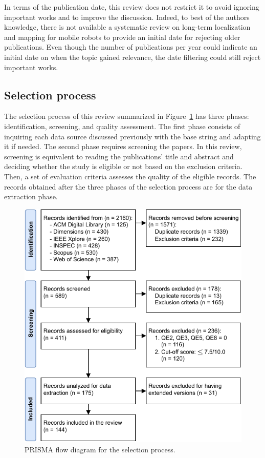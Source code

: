 In terms of the publication date, this review does not restrict it to avoid ignoring important works and to improve the discussion. Indeed, to best of the authors knowledge, there is not available a systematic review on long-term localization and mapping for mobile robots to provide an initial date for rejecting older publications. Even though the number of publications per year could indicate an initial date on when the topic gained relevance, the date filtering could still reject important works.

\subsection{Selection process}
\label{sec:methodology:selection}

The selection process of this review summarized in Figure~\ref{fig:methodology:prisma-flow} has three phases: identification, screening, and quality assessment. The first phase consists of inquiring each data source discussed previously with the base string and adapting it if needed. The second phase requires screening the papers. In this review, screening is equivalent to reading the publications' title and abstract and deciding whether the study is eligible or not based on the exclusion criteria. Then, a set of evaluation criteria assesses the quality of the eligible records. The records obtained after the three phases of the selection process are for the data extraction phase.

\begin{figure}[h]
  \centering
  \includegraphics[width=\columnwidth]{figures/selection.pdf}
  \caption{PRISMA flow diagram for the selection process.}
  \label{fig:methodology:prisma-flow}
\end{figure}

